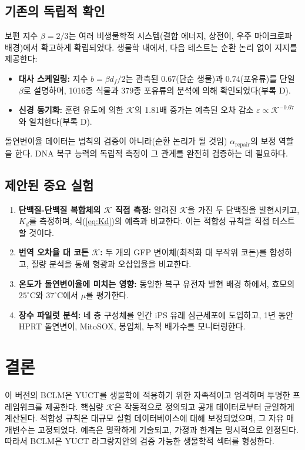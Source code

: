 \documentclass[12pt,a4paper]{article}
\newcommand{\REL}{\mathcal{K}}          %
\begin{document}
	\subsection{기존의 독립적 확인}
	보편 지수 \(\beta = 2/3\)는 여러 비생물학적 시스템(결합 에너지, 상전이, 우주 마이크로파 배경)에서 확고하게 확립되었다. 생물학 내에서, 다음 테스트는 순환 논리 없이 지지를 제공한다:
	\begin{itemize}
		\item \textbf{대사 스케일링:} 지수 \(b = \beta d_f/2\)는 관측된 \(0.67\)(단순 생물)과 \(0.74\)(포유류)를 단일 \(\beta\)로 설명하며, 1016종 식물과 379종 포유류의 분석에 의해 확인되었다(부록 D).
		\item \textbf{신경 동기화:} 훈련 유도에 의한 \(\REL\)의 1.81배 증가는 예측된 오차 감소 \(\varepsilon \propto \REL^{-0.67}\)와 일치한다(부록 D).
	\end{itemize}
	돌연변이율 데이터는 법칙의 검증이 아니라(순환 논리가 될 것임) \(\alpha_{\mathrm{repair}}\)의 보정 역할을 한다. DNA 복구 능력의 독립적 측정이 그 관계를 완전히 검증하는 데 필요하다.
	
	\subsection{제안된 중요 실험}
	\begin{enumerate}
		\item \textbf{단백질-단백질 복합체의 \(\REL\) 직접 측정:} 알려진 \(\REL\)을 가진 두 단백질을 발현시키고, \(K_d\)를 측정하며, 식(\ref{eq:Kd})의 예측과 비교한다. 이는 적합성 규칙을 직접 테스트할 것이다.
		\item \textbf{번역 오차율 대 코돈 \(\REL\):} 두 개의 GFP 변이체(최적화 대 무작위 코돈)를 합성하고, 질량 분석을 통해 형광과 오삽입율을 비교한다.
		\item \textbf{온도가 돌연변이율에 미치는 영향:} 동일한 복구 유전자 발현 배경 하에서, 효모의 \(25^\circ\text{C}\)와 \(37^\circ\text{C}\)에서 \(\mu\)를 평가한다.
		\item \textbf{장수 파일럿 분석:} 네 층 구성체를 인간 iPS 유래 심근세포에 도입하고, 1년 동안 HPRT 돌연변이, MitoSOX, 봉입체, 누적 배가수를 모니터링한다.
	\end{enumerate}
	
	\section{결론}
	이 버전의 BCLM은 YUCT를 생물학에 적용하기 위한 자족적이고 엄격하며 투명한 프레임워크를 제공한다. 핵심량 \(\REL\)은 작동적으로 정의되고 공개 데이터로부터 균일하게 계산된다. 적합성 규칙은 대규모 실험 데이터베이스에 대해 보정되었으며, 그 자유 매개변수는 고정되었다. 예측은 명확하게 기술되고, 가정과 한계는 명시적으로 인정된다. 따라서 BCLM은 YUCT 라그랑지안의 검증 가능한 생물학적 섹터를 형성한다.
	
\end{document}

